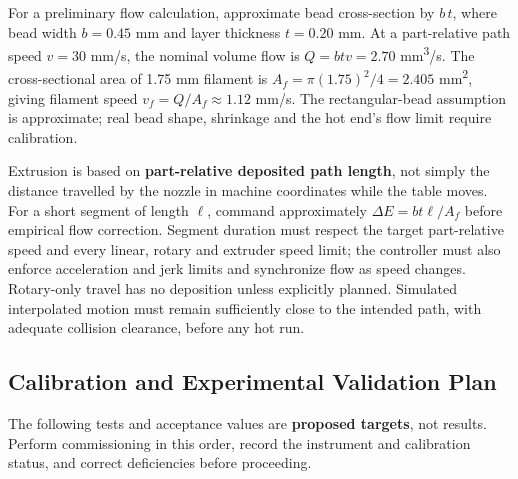 \documentclass[12pt,a4paper]{article}
\begin{document}
For a preliminary flow calculation, approximate bead cross-section by \(b\,t\), where bead width
  \(b=0.45\) mm and layer thickness \(t=0.20\) mm. At a part-relative path speed \(v=30\) mm/s, the
  nominal volume flow is \(Q=btv=2.70\) mm\textsuperscript{3}/s. The cross-sectional area of 1.75 mm
  filament is \(A_f=\pi(1.75)^2/4=2.405\) mm\textsuperscript{2}, giving filament speed
  \(v_f=Q/A_f\approx1.12\) mm/s. The rectangular-bead assumption is approximate; real bead shape,
  shrinkage and the hot end's flow limit require calibration.

Extrusion is based on \textbf{part-relative deposited path length}, not simply the distance travelled by
  the nozzle in machine coordinates while the table moves. For a short segment of length \(\ell\),
  command approximately \(\Delta E=bt\ell/A_f\) before empirical flow correction. Segment duration must
  respect the target part-relative speed and every linear, rotary and extruder speed limit; the
  controller must also enforce acceleration and jerk limits and synchronize flow as speed changes.
  Rotary-only travel has no deposition unless explicitly planned. Simulated interpolated motion must
  remain sufficiently close to the intended path, with adequate collision clearance, before any hot run.

\subsection{Calibration and Experimental Validation
  Plan}\label{calibration-and-experimental-validation-plan}

The following tests and acceptance values are \textbf{proposed targets}, not results. Perform
  commissioning in this order, record the instrument and calibration status, and correct deficiencies
  before proceeding.
\end{document}
